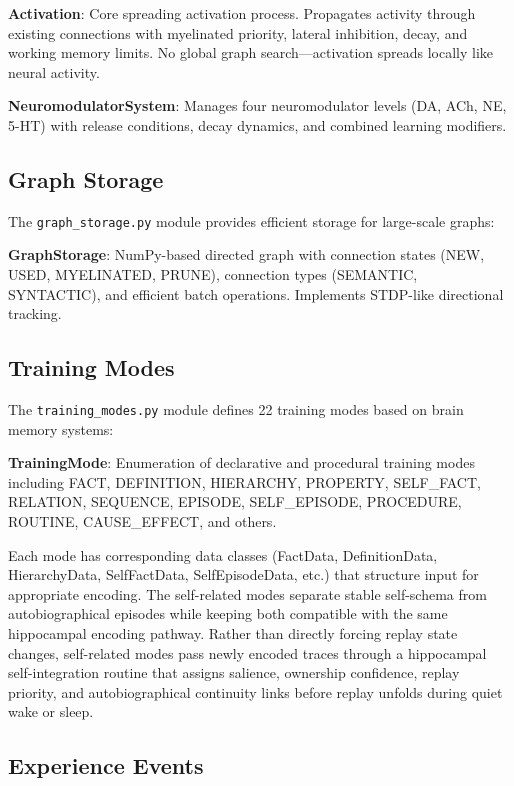 \documentclass[11pt]{article}
\begin{document}
\textbf{Activation}: Core spreading activation process. Propagates activity through existing connections with myelinated priority, lateral inhibition, decay, and working memory limits. No global graph search---activation spreads locally like neural activity.

\textbf{NeuromodulatorSystem}: Manages four neuromodulator levels (DA, ACh, NE, 5-HT) with release conditions, decay dynamics, and combined learning modifiers.

\subsection{Graph Storage}

The \texttt{graph\_storage.py} module provides efficient storage for large-scale graphs:

\textbf{GraphStorage}: NumPy-based directed graph with connection states (NEW, USED, MYELINATED, PRUNE), connection types (SEMANTIC, SYNTACTIC), and efficient batch operations. Implements STDP-like directional tracking.

\subsection{Training Modes}

The \texttt{training\_modes.py} module defines 22 training modes based on brain memory systems:

\textbf{TrainingMode}: Enumeration of declarative and procedural training modes including FACT, DEFINITION, HIERARCHY, PROPERTY, SELF\_FACT, RELATION, SEQUENCE, EPISODE, SELF\_EPISODE, PROCEDURE, ROUTINE, CAUSE\_EFFECT, and others.

Each mode has corresponding data classes (FactData, DefinitionData, HierarchyData, SelfFactData, SelfEpisodeData, etc.) that structure input for appropriate encoding. The self-related modes separate stable self-schema from autobiographical episodes while keeping both compatible with the same hippocampal encoding pathway.
Rather than directly forcing replay state changes, self-related modes pass newly encoded traces through a hippocampal self-integration routine that assigns salience, ownership confidence, replay priority, and autobiographical continuity links before replay unfolds during quiet wake or sleep.

\subsection{Experience Events}
\end{document}
